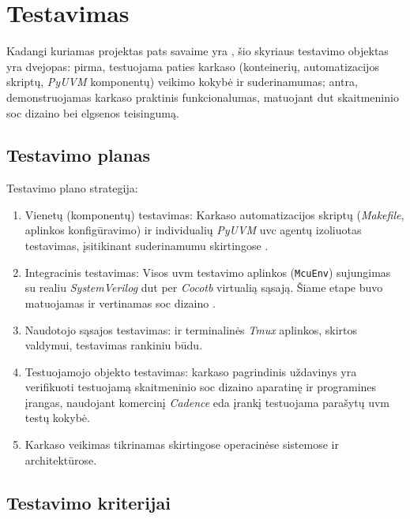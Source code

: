 \section{Testavimas}\label{section:testing}

Kadangi kuriamas projektas pats savaime yra   , šio skyriaus testavimo objektas yra dvejopas: pirma, testuojama paties karkaso (konteinerių, automatizacijos skriptų, \textit{PyUVM} komponentų) veikimo kokybė ir suderinamumas; antra, demonstruojamas karkaso praktinis funkcionalumas, matuojant \gls{dut} skaitmeninio \gls{soc} dizaino  bei elgsenos teisingumą.

\subsection{Testavimo planas}

Testavimo plano strategija:
\begin{enumerate}
	\item Vienetų (komponentų) testavimas: Karkaso automatizacijos skriptų (\textit{Makefile}, aplinkos konfigūravimo) ir individualių \textit{PyUVM} \gls{uvc} agentų izoliuotas testavimas, įsitikinant suderinamumu skirtingose .
	\item Integracinis testavimas: Visos \gls{uvm} testavimo aplinkos (\texttt{McuEnv}) sujungimas su realiu \textit{SystemVerilog} \gls{dut} per \textit{Cocotb} virtualią sąsają. Šiame etape buvo matuojamas ir vertinamas \gls{soc} dizaino .
	\item Naudotojo sąsajos testavimas:  ir terminalinės \textit{Tmux} aplinkos, skirtos  valdymui, testavimas rankiniu būdu.
	\item Testuojamojo objekto testavimas: karkaso pagrindinis uždavinys yra verifikuoti testuojamą skaitmeninio \gls{soc} dizaino aparatinę ir programines įrangas, naudojant komercinį \textit{Cadence} \gls{eda} įrankį testuojama parašytų \gls{uvm} testų kokybė.
	\item Karkaso veikimas tikrinamas skirtingose operacinėse sistemose ir architektūrose.
\end{enumerate}

\subsection{Testavimo kriterijai}

